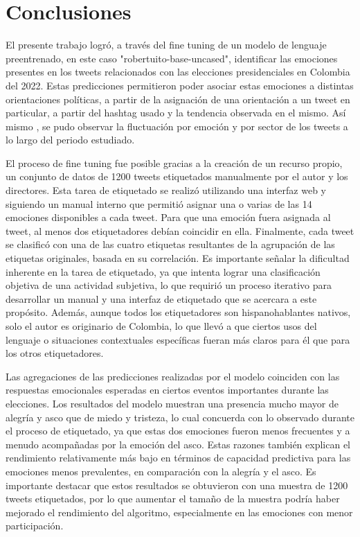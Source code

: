 \chapter{Conclusiones}
 

El presente trabajo logró, a través del fine tuning de un modelo de lenguaje preentrenado, en este caso "robertuito-base-uncased", identificar las emociones presentes en los tweets relacionados con las elecciones presidenciales en Colombia del 2022. Estas predicciones permitieron poder asociar estas emociones a distintas orientaciones políticas, a partir de la asignación de una orientación a un tweet en particular, a partir del hashtag usado y la tendencia observada en el mismo. Así mismo , se pudo observar la fluctuación por emoción y por sector de los tweets a lo largo del periodo estudiado.

El proceso de fine tuning fue posible gracias a la creación de un recurso propio, un conjunto de datos de 1200 tweets etiquetados manualmente por el autor y los directores. Esta tarea de etiquetado se realizó utilizando una interfaz web y siguiendo un manual interno que permitió asignar una o varias de las 14 emociones disponibles a cada tweet. Para que una emoción fuera asignada al tweet, al menos dos etiquetadores debían coincidir en ella. Finalmente, cada tweet se clasificó con una de las cuatro etiquetas resultantes de la agrupación de las etiquetas originales, basada en su correlación. Es importante señalar la dificultad inherente en la tarea de etiquetado, ya que intenta lograr una clasificación objetiva de una actividad subjetiva, lo que requirió un proceso iterativo para desarrollar un manual y una interfaz de etiquetado que se acercara a este propósito. Además, aunque todos los etiquetadores son hispanohablantes nativos, solo el autor es originario de Colombia, lo que llevó a que ciertos usos del lenguaje o situaciones contextuales específicas fueran más claros para él que para los otros etiquetadores.

Las agregaciones de las predicciones realizadas por el modelo coinciden con las respuestas emocionales esperadas en ciertos eventos importantes durante las elecciones. Los resultados del modelo muestran una presencia mucho mayor de alegría y asco que de miedo y tristeza, lo cual concuerda con lo observado durante el proceso de etiquetado, ya que estas dos emociones fueron menos frecuentes y a menudo acompañadas por la emoción del asco. Estas razones también explican el rendimiento relativamente más bajo en términos de capacidad predictiva para las emociones menos prevalentes, en comparación con la alegría y el asco. Es importante destacar que estos resultados se obtuvieron con una muestra de 1200 tweets etiquetados, por lo que aumentar el tamaño de la muestra podría haber mejorado el rendimiento del algoritmo, especialmente en las emociones con menor participación.

